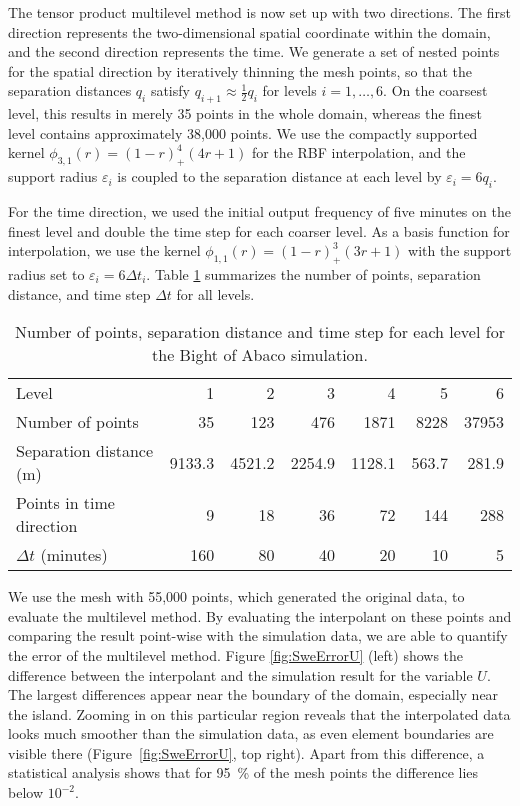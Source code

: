 \documentclass[	a4paper, 
								11pt]{article}
\theoremstyle{plain}
\begin{document}
The tensor product multilevel method is now set up with two directions. The first direction represents the two-dimensional spatial coordinate within the domain, and the second direction represents the time. 
We generate a set of nested points for the spatial direction by iteratively thinning the mesh points, so that the separation distances $q_i$ satisfy $q_{i+1} \approx \frac{1}{2} q_i$ for levels $i = 1, \dots, 6$.
On the coarsest level, this results in merely 35 points in the whole domain, whereas the finest level contains approximately 38,000 points.
We use the compactly supported kernel $\phi_{3,1}(r) = (1-r)^4_+(4r+1)$
for the RBF interpolation, and the support radius $\varepsilon_i$ is coupled to the separation distance at each level by $\varepsilon_i = 6 q_i$.

For the time direction, we used the initial output frequency of five minutes on the finest level and double the time step for each coarser level. As a basis function for interpolation, we use the kernel $\phi_{1,1}(r) = (1-r)^3_+(3r+1)$ with the support radius set to $\varepsilon_i = 6 \Delta t_i$. Table \ref{tab:SweMultilevelSets} summarizes the number of points, separation distance, and time step $\Delta t$ for all levels.

\begin{table}[t]
    \centering
    \caption{Number of points, separation distance and time step for each level for the Bight of Abaco simulation.}
    \begin{tabular}{l rrrrrr}
    \toprule
    Level & 1 & 2 & 3 & 4 & 5 & 6 \\ 
    Number of points    &     35 &     123 &    476 &   1871 &  8228 & 37953 \\
    Separation distance (m) & 9133.3 & 4521.2 & 2254.9 & 1128.1 & 563.7 & 281.9 \\
    Points in time direction &      9 &      18 &     36 &     72 &   144 &   288 \\
    $\Delta t$ (minutes)&    160 &      80 &     40 &     20 &    10 &     5 \\ 
    \bottomrule
    \end{tabular}
    \label{tab:SweMultilevelSets}
\end{table}

We use the mesh with 55,000 points, which generated the original data, to evaluate the multilevel method.
By evaluating the interpolant on these points and comparing the result point-wise with the simulation data, we are able to quantify the error of the multilevel method.
Figure \ref{fig:SweErrorU} (left) shows the difference between the interpolant and the simulation result for the variable $U$. 
The largest differences appear near the boundary of the domain, especially near the island. Zooming in on this particular region reveals that the interpolated data looks much smoother than the simulation data, as even element boundaries are visible there (Figure~\ref{fig:SweErrorU}, top right). Apart from this difference, a statistical analysis shows that for 95~\% of the mesh points the difference lies below $10^{-2}$.
\end{document}
